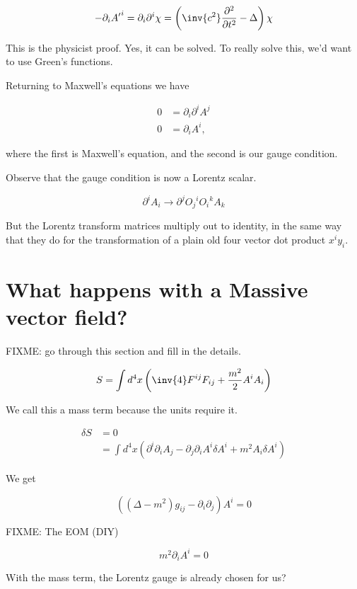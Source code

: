 \begin{equation}\label{eqn:relativisticElectrodynamicsL14:510}
-\partial_i {A'}^i = \partial_i \partial^i \chi = \left( \inv{c^2} \frac{\partial^2}{\partial t^2} - \Delta \right) \chi
\end{equation}

This is the physicist proof.  Yes, it can be solved.  To really solve this, we'd want to use Green's functions.

Returning to Maxwell's equations we have

\begin{align}\label{eqn:relativisticElectrodynamicsL14:530}
0 &= \partial_i \partial^i A^j \\
0 &= \partial_i A^i ,
\end{align}

where the first is Maxwell's equation, and the second is our gauge condition.

Observe that the gauge condition is now a Lorentz scalar.

\begin{equation}\label{eqn:relativisticElectrodynamicsL14:550}
\partial^i A_i \rightarrow \partial^j {O_j}^i {O_i}^k A_k
\end{equation}

But the Lorentz transform matrices multiply out to identity, in the same way that they do for the transformation of a plain old four vector dot product $x^i y_i$.

\section{What happens with a Massive vector field?}

FIXME: go through this section and fill in the details.

\begin{equation}\label{eqn:relativisticElectrodynamicsL14:570}
S = \int d^4 x \left( \inv{4} F^{ij} F_{ij} + \frac{m^2}{2} A^i A_i \right)
\end{equation}

We call this a mass term because the units require it.

\begin{align*}
\delta S 
&= 0  \\
&= \int d^4 x \left( \partial^i \partial_i A_j - \partial_j \partial_i A^i \delta A^i + m^2 A_i \delta A^i \right)
\end{align*}

We get 

\begin{equation}\label{eqn:relativisticElectrodynamicsL14:590}
\left( (\Delta - m^2) g_{ij} - \partial_i \partial_j \right) A^i = 0
\end{equation}

FIXME: The EOM (DIY)

\begin{equation}\label{eqn:relativisticElectrodynamicsL14:610}
m^2 \partial_i A^i = 0
\end{equation}

With the mass term, the Lorentz gauge is already chosen for us?

\EndArticle
